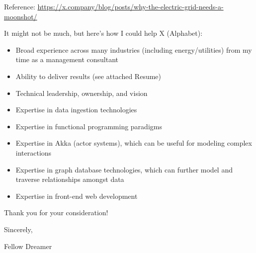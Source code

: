 \documentclass{article}
\begin{document}
Reference: \url{https://x.company/blog/posts/why-the-electric-grid-needs-a-moonshot/}

\bigskip %

It might not be much, but here's how I could help X (Alphabet):

\begin{itemize}
  \item Broad experience across many industries (including energy/utilities) from my time as a management consultant
  \item Ability to deliver results (see attached Resume)
	\item Technical leadership, ownership, and vision
  \item Expertise in data ingestion technologies
  \item Expertise in functional programming paradigms
  \item Expertise in Akka (actor systems), which can be useful for modeling complex interactions
  \item Expertise in graph database technologies, which can further model and traverse relationships amongst data
	\item Expertise in front-end web development
\end{itemize}

Thank you for your consideration!

\bigskip %

Sincerely,

\vspace{50pt} %

Fellow Dreamer
\end{document}
